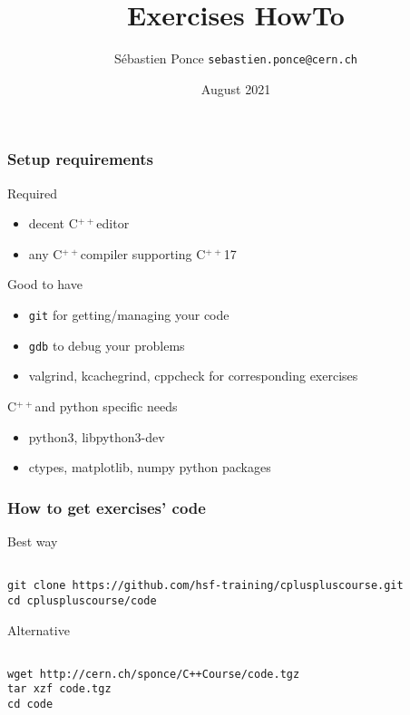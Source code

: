 \documentclass[compress]{beamer}
\title{Exercises HowTo}
\author[S. Ponce]{S\'ebastien Ponce  \texttt{sebastien.ponce@cern.ch}}
\institute{CERN}
\date{August 2021}
\newcommand{\cpp}{C$^{++}$}
\begin{document}
\begin{frame}
  \titlepage
\end{frame}

\begin{frame}
  \frametitle{Setup requirements}
  \begin{exampleblock}{Required}
    \begin{itemize}
    \item decent \cpp editor
    \item any \cpp compiler supporting \cpp17
    \end{itemize}
  \end{exampleblock}
  \begin{alertblock}{Good to have}
    \begin{itemize}
    \item \texttt{git} for getting/managing your code
    \item \texttt{gdb} to debug your problems
    \item valgrind, kcachegrind, cppcheck for corresponding exercises
    \end{itemize}
  \end{alertblock}
  \begin{block}{\cpp and python specific needs}
    \begin{itemize}
    \item python3, libpython3-dev
    \item ctypes, matplotlib, numpy python packages
    \end{itemize}
  \end{block}
\end{frame}

\begin{frame}[fragile]
  \setlength{\textwidth}{11.2cm}
  \frametitle{How to get exercises' code}
  \begin{exampleblock}{Best way}
    \small
    \begin{verbatim}
  
git clone https://github.com/hsf-training/cpluspluscourse.git
cd cpluspluscourse/code
    \end{verbatim}
  \end{exampleblock}
  \begin{alertblock}{Alternative}
    \small
    \begin{verbatim}
  
wget http://cern.ch/sponce/C++Course/code.tgz
tar xzf code.tgz
cd code
    \end{verbatim}    
  \end{alertblock}
\end{frame}
\end{document}
